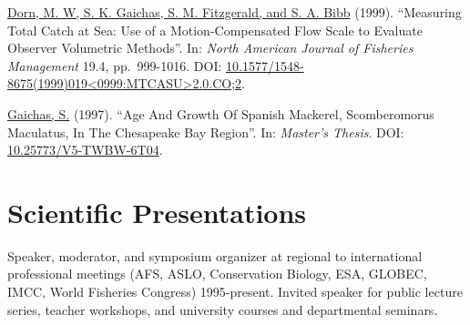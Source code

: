 \documentclass[11pt, a4paper]{awesome-cv}
\begin{document}
\protect\hyperlink{cite-dorn_measuring_1999}{Dorn, M. W, S. K. Gaichas, S. M.
Fitzgerald, and S. A. Bibb} (1999).
``Measuring Total Catch at Sea: Use of a Motion-Compensated Flow Scale
to Evaluate Observer Volumetric Methods''. In: \emph{North American Journal
of Fisheries Management} 19.4, pp.~999-1016. DOI:
\href{https://doi.org/10.1577\%2F1548-8675\%281999\%29019\%3C0999\%3AMTCASU\%3E2.0.CO\%3B2}{10.1577/1548-8675(1999)019\textless0999:MTCASU\textgreater2.0.CO;2}.

\protect\hyperlink{cite-gaichas_age_1997}{Gaichas, S.}
(1997). ``Age And Growth Of Spanish Mackerel, Scomberomorus Maculatus,
In The Chesapeake Bay Region''. In: \emph{Master's Thesis}. DOI:
\href{https://doi.org/10.25773\%2FV5-TWBW-6T04}{10.25773/V5-TWBW-6T04}.

\hypertarget{scientific-presentations}{%
\section{Scientific Presentations}\label{scientific-presentations}}

Speaker, moderator, and symposium organizer at regional to international professional meetings (AFS, ASLO, Conservation Biology, ESA, GLOBEC, IMCC, World Fisheries Congress) 1995-present. Invited speaker for public lecture series, teacher workshops, and university courses and departmental seminars.
\end{document}
